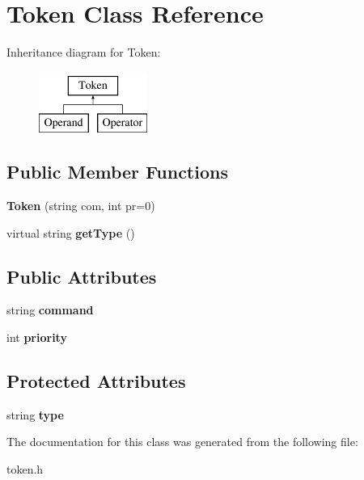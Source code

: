 \hypertarget{classToken}{\section{Token Class Reference}
\label{classToken}
}
Inheritance diagram for Token\-:\begin{figure}[H]
\begin{center}
\leavevmode
\includegraphics[height=2.000000cm]{classToken}
\end{center}
\end{figure}
\subsection*{Public Member Functions}
\begin{DoxyCompactItemize}
\item 
\hypertarget{classToken_aa1133017c00ececdf033dfb378c79e17}{{\bfseries Token} (string com, int pr=0)}\label{classToken_aa1133017c00ececdf033dfb378c79e17}

\item 
\hypertarget{classToken_acb820760827c69e98f39ca8d7ce425b0}{virtual string {\bfseries get\-Type} ()}\label{classToken_acb820760827c69e98f39ca8d7ce425b0}

\end{DoxyCompactItemize}
\subsection*{Public Attributes}
\begin{DoxyCompactItemize}
\item 
\hypertarget{classToken_a7c2cdb83b20d890bee24bdba999b0f80}{string {\bfseries command}}\label{classToken_a7c2cdb83b20d890bee24bdba999b0f80}

\item 
\hypertarget{classToken_a8125cc8499770f87f3540c81f889e039}{int {\bfseries priority}}\label{classToken_a8125cc8499770f87f3540c81f889e039}

\end{DoxyCompactItemize}
\subsection*{Protected Attributes}
\begin{DoxyCompactItemize}
\item 
\hypertarget{classToken_aa1a83620e3ce3a181768b7f8b268100c}{string {\bfseries type}}\label{classToken_aa1a83620e3ce3a181768b7f8b268100c}

\end{DoxyCompactItemize}


The documentation for this class was generated from the following file\-:\begin{DoxyCompactItemize}
\item 
token.\-h\end{DoxyCompactItemize}
